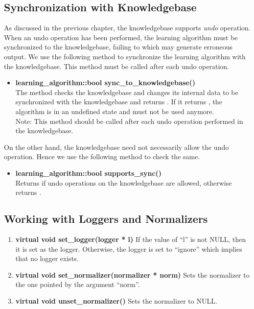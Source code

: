 \subsection*{Synchronization with Knowledgebase}

As discussed in the previous chapter, the knowledgebase supports \emph{undo} operation. When an undo operation has been performed, the learning algorithm must be synchronized to the knowledgebase, failing to which may generate erroneous output. We use the following method to synchronize the learning algorithm with the knowledgebase. This method must be called after each undo operation.

\begin{itemize}

 \item \textbf{learning\_algorithm::bool sync\_to\_knowledgebase()} \\
	The method checks the knowledgebase and changes its internal data to be synchronized with the knowledgebase and returns \true. If it returns \false, the algorithm is in an undefined state and must not be used anymore. \\
	Note: This method should be called after each undo operation performed in the knowledgebase.

\end{itemize}

On the other hand, the knowledgebase need not necessarily allow the undo operation. Hence we use the following method to check the same.
\begin{itemize}
 
 \item \textbf{learning\_algorithm::bool supports\_sync()} \\
	 Returns \true if undo operations on the knowledgebase are allowed, otherwise returns \false.

\end{itemize}


\subsection*{Working with Loggers and Normalizers}

\begin{enumerate}
 \item \textbf{virtual void set\_logger(logger * l)} \vskip 1pt
	If the value of ``l'' is not NULL, then it is set as the logger. Otherwise, the logger is set to ``ignore'' which implies that no logger exists.

 \item \textbf{virtual void set\_normalizer(normalizer * norm)} \vskip 1pt
	Sets the normalizer to the one pointed by the argument ``norm''.

 \item \textbf{virtual void unset\_normalizer()} \vskip 1pt
	Sets the normalizer to NULL. 
\end{enumerate}

